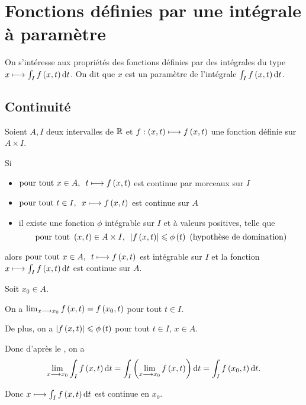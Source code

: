 \section{Fonctions définies par une intégrale à paramètre}

On s'intéresse aux propriétés des fonctions définies par des intégrales du type \(x\mapsto\int_If\paren{x,t}\odif{t}\). On dit que \(x\) est un paramètre de l'intégrale \(\int_If\paren{x,t}\odif{t}\).

\subsection{Continuité}

\begin{theo}
Soient \(A,I\) deux intervalles de \(\mathbb{R}\) et \(f:\left(x,t\right)\longmapsto f\left(x,t\right)\) une fonction définie sur \(A\times I\).

Si

\begin{itemize}
    \item \(\quantifs{\tpt x\in A}t\mapsto f\paren{x,t}\) est continue par morceaux sur \(I\) \\
    \item \(\quantifs{\tpt t\in I}x\mapsto f\paren{x,t}\) est continue sur \(A\) \\
    \item il existe une fonction \(\phi\) intégrable sur \(I\) et à valeurs positives, telle que \[\quantifs{\tpt\paren{x,t}\in A\times I}\abs{f\paren{x,t}}\leq\phi\paren{t}\text{ (hypothèse de domination)}\]
\end{itemize}

alors \(\quantifs{\tpt x\in A}t\mapsto f\paren{x,t}\) est intégrable sur \(I\) et la fonction \(x\mapsto\int_If\paren{x,t}\odif{t}\) est continue sur \(A\).
\end{theo}

\begin{dem}
Soit \(x_0\in A\).

On a \(\lim_{x\longrightarrow x_0}f\left(x,t\right)=f\left(x_0,t\right)\) pour tout \(t\in I\).

De plus, on a \(\left\lvert f\left(x,t\right)\right\rvert\leqslant\phi\left(t\right)\) pour tout \(t\in I\), \(x\in A\).

Donc d'après le , on a \[\lim_{x\to x_0}\int_If\paren{x,t}\odif{t}=\int_I\paren{\lim_{x\to x_0}f\paren{x,t}}\odif{t}=\int_If\paren{x_0,t}\odif{t}.\]

Donc \(x\mapsto\int_If\paren{x,t}\odif{t}\) est continue en \(x_0\).
\end{dem}

